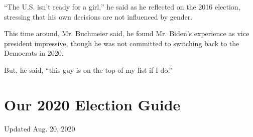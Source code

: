 ``The U.S. isn't ready for a girl,'' he said as he reflected on the 2016
election, stressing that his own decisions are not influenced by gender.

This time around, Mr. Buchmeier said, he found Mr. Biden's experience as
vice president impressive, though he was not committed to switching back
to the Democrats in 2020.

But, he said, ``this guy is on the top of my list if I do.''

\hypertarget{our-2020-election-guide}{%
\section{Our 2020 Election Guide}\label{our-2020-election-guide}}

Updated Aug. 20, 2020

